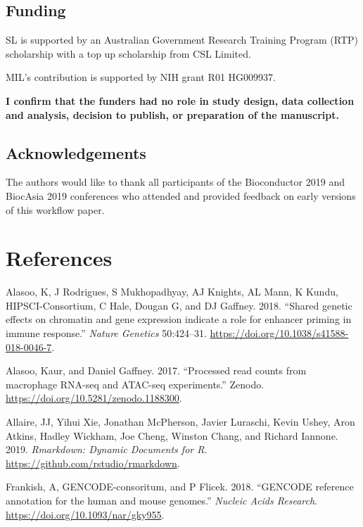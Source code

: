 \documentclass[
]{article}
\begin{document}
\hypertarget{funding}{%
\subsection{Funding}\label{funding}}

SL is supported by an Australian Government Research Training Program (RTP)
scholarship with a top up scholarship from CSL Limited.

MIL's contribution is supported by NIH grant R01 HG009937.

\textbf{I confirm that the funders had no role in study design, data collection and
analysis, decision to publish, or preparation of the manuscript.}

\hypertarget{acknowledgements}{%
\subsection{Acknowledgements}\label{acknowledgements}}

The authors would like to thank all participants of the Bioconductor 2019 and
BiocAsia 2019 conferences who attended and provided feedback on early versions
of this workflow paper.

\hypertarget{references}{%
\section*{References}\label{references}}

\hypertarget{refs}{}
\leavevmode\hypertarget{ref-alasoo}{}%
Alasoo, K, J Rodrigues, S Mukhopadhyay, AJ Knights, AL Mann, K Kundu, HIPSCI-Consortium, C Hale, Dougan G, and DJ Gaffney. 2018. ``Shared genetic effects on chromatin and gene expression indicate a role for enhancer priming in immune response.'' \emph{Nature Genetics} 50:424--31. \url{https://doi.org/10.1038/s41588-018-0046-7}.

\leavevmode\hypertarget{ref-alasooZenodo}{}%
Alasoo, Kaur, and Daniel Gaffney. 2017. ``Processed read counts from macrophage RNA-seq and ATAC-seq experiments.'' Zenodo. \url{https://doi.org/10.5281/zenodo.1188300}.

\leavevmode\hypertarget{ref-rmarkdown}{}%
Allaire, JJ, Yihui Xie, Jonathan McPherson, Javier Luraschi, Kevin Ushey, Aron Atkins, Hadley Wickham, Joe Cheng, Winston Chang, and Richard Iannone. 2019. \emph{Rmarkdown: Dynamic Documents for R}. \url{https://github.com/rstudio/rmarkdown}.

\leavevmode\hypertarget{ref-gencode}{}%
Frankish, A, GENCODE-consoritum, and P Flicek. 2018. ``GENCODE reference annotation for the human and mouse genomes.'' \emph{Nucleic Acids Research}. \url{https://doi.org/10.1093/nar/gky955}.
\end{document}
